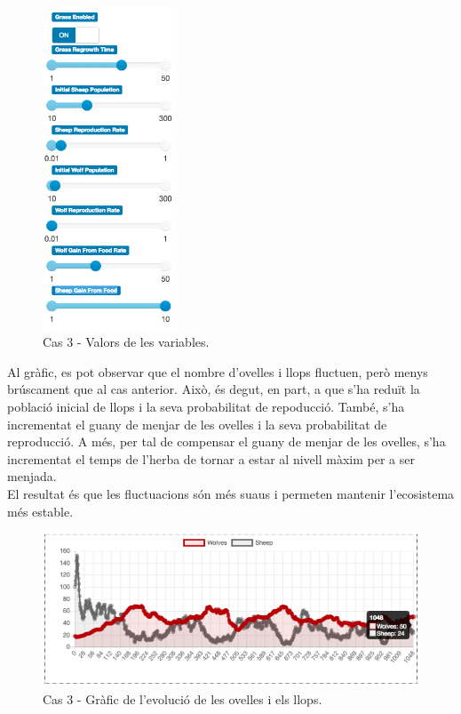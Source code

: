\documentclass{article} %
\begin{document}
{	\begin{figure}[H]
		\includegraphics[width=4cm]{case_10_vars}
		\centering
		\color{blue}
		\caption{Cas 3 - Valors de les variables.}\label{visina8}
	\end{figure}

	Al gràfic, es pot observar que el nombre d'ovelles i llops fluctuen, però menys brúscament que al cas anterior. Això, és degut, en part, a que s'ha reduït la població inicial de llops i la seva probabilitat de repoducció. També, s'ha incrementat el guany de menjar de les ovelles i la seva probabilitat de reproducció. A més, per tal de compensar el guany de menjar de les ovelles, s'ha incrementat el temps de l'herba de tornar a estar al nivell màxim per a ser menjada. \\

	El resultat és que les fluctuacions són més suaus i permeten mantenir l'ecosistema més estable.

	\begin{figure}[H]
		\begin{changemargin}{-1cm}{0.5cm}
			\includegraphics[width=14cm]{case_10_graph_2}
			\centering
			\color{blue}
			\caption{Cas 3 - Gràfic de l'evolució de les ovelles i els llops.}\label{visina8}
		\end{changemargin}
	\end{figure}

}
\end{document}
